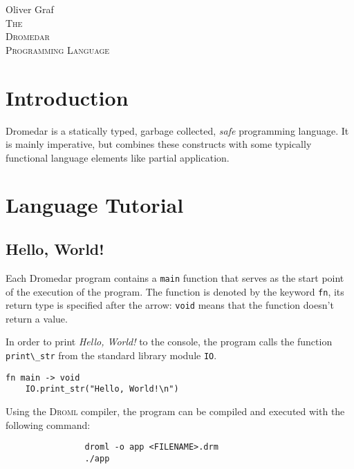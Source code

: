 \documentclass{article}
\newcommand{\code}[1]{\lstinline[columns=fixed]{#1}}
\begin{document}
	
	\vfill
	\begin{center}
		\large{Oliver Graf}\\
		\vspace{5cm}
		\large{\textsc{The}}\\\vspace{1cm}
		\Huge{\textsc{Dromedar}}\\\vspace{1cm}
		\large{\textsc{Programming Language}}
	\end{center}
	\vfill
	
	\clearpage
	
	\setcounter{tocdepth}{1}
	\tableofcontents
	\clearpage
	
	\section{Introduction}
	
		Dromedar is a statically typed, garbage collected, \textit{safe} programming language. It is mainly imperative, but combines these constructs with some typically functional language elements like partial application.
			
	\section{Language Tutorial}
	
		\subsection{Hello, World!}
		
			Each Dromedar program contains a \code{main} function that serves as the start point of the execution of the program. The function is denoted by the keyword \code{fn}, its return type is specified after the arrow: \code{void} means that the function doesn't return a value.
			
			In order to print \textit{Hello, World!} to the console, the program calls the function \code{print\_str} from the standard library module \code{IO}.
		
			\begin{lstlisting}
fn main -> void
	IO.print_str("Hello, World!\n")
			\end{lstlisting}
			
			Using the \textsc{Droml} compiler, the program can be compiled and executed with the following command:
			
			\begin{verbatim}
				droml -o app <FILENAME>.drm
				./app
			\end{verbatim}
			
\end{document}
